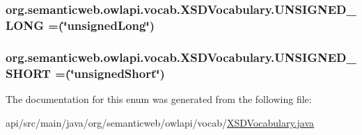 \hypertarget{enumorg_1_1semanticweb_1_1owlapi_1_1vocab_1_1_x_s_d_vocabulary_a3c305317f4a55b4b8add2aa071d02116}{
\subsubsection[{U\-N\-S\-I\-G\-N\-E\-D\-\_\-\-L\-O\-N\-G}]{\setlength{\rightskip}{0pt plus 5cm}org.\-semanticweb.\-owlapi.\-vocab.\-X\-S\-D\-Vocabulary.\-U\-N\-S\-I\-G\-N\-E\-D\-\_\-\-L\-O\-N\-G =(\char`\"{}unsigned\-Long\char`\"{})}}\label{enumorg_1_1semanticweb_1_1owlapi_1_1vocab_1_1_x_s_d_vocabulary_a3c305317f4a55b4b8add2aa071d02116}
\hypertarget{enumorg_1_1semanticweb_1_1owlapi_1_1vocab_1_1_x_s_d_vocabulary_ad91f31bb3cef710354db46511d0db8d5}{
\subsubsection[{U\-N\-S\-I\-G\-N\-E\-D\-\_\-\-S\-H\-O\-R\-T}]{\setlength{\rightskip}{0pt plus 5cm}org.\-semanticweb.\-owlapi.\-vocab.\-X\-S\-D\-Vocabulary.\-U\-N\-S\-I\-G\-N\-E\-D\-\_\-\-S\-H\-O\-R\-T =(\char`\"{}unsigned\-Short\char`\"{})}}\label{enumorg_1_1semanticweb_1_1owlapi_1_1vocab_1_1_x_s_d_vocabulary_ad91f31bb3cef710354db46511d0db8d5}


The documentation for this enum was generated from the following file\-:\begin{DoxyCompactItemize}
\item 
api/src/main/java/org/semanticweb/owlapi/vocab/\hyperlink{_x_s_d_vocabulary_8java}{X\-S\-D\-Vocabulary.\-java}\end{DoxyCompactItemize}
